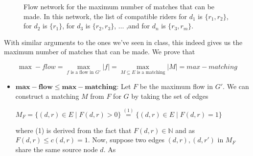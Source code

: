 \documentclass{article}
\begin{document}
\begin{enumerate}[label=(\alph*)]
\begin{enumerate}[label=(\roman*)]
\begin{figure*}[h]
            \caption{Flow network for the maximum number of matches that can be made. In this network, the list of compatible riders for $d_1$ is $\{r_1, r_2\}$, for $d_2$ is $\{r_1\}$, for $d_3$ is $\{r_2, r_3\}$, $\ldots$ ,and for $d_n$ is $\{r_3, r_m\}$.}
            \label{fig:q10a}
        \end{figure*}

        With similar arguments to the ones we've seen in class, this indeed gives us the maximum number of matches that can be made. We prove that 
        
        \begin{equation*}
            \max-flow = \max\limits_{f \text{ is a flow in $G'$}} \left|f\right| = \max\limits_{M \subseteq E \text{ is a matching}} \left|M\right| = max-matching
        \end{equation*}


        \begin{itemize}
            \item $\mathbf{max-flow \leq max-matching}$: Let $F$ be the maximum flow in $G'$. We can construct a matching $M$ from $F$ for $G$ by taking the set of edges 
            
            \begin{center}
            $M_F = \{(d, r) \in E \mid F(d, r) > 0 \} \overset{(1)}{=} \{(d, r) \in E \mid F(d, r) = 1 \}$
            \end{center}
            
            where (1) is derived from the fact that $F(d, r) \in \mathbb{N}$ and as $F(d, r) \leq c(d, r) = 1$. Now, suppose two edges $(d, r), (d, r')$ in $M_F$ share the same source node $d$. As 
            

\end{itemize}
\end{enumerate}
\end{enumerate}
\end{document}
